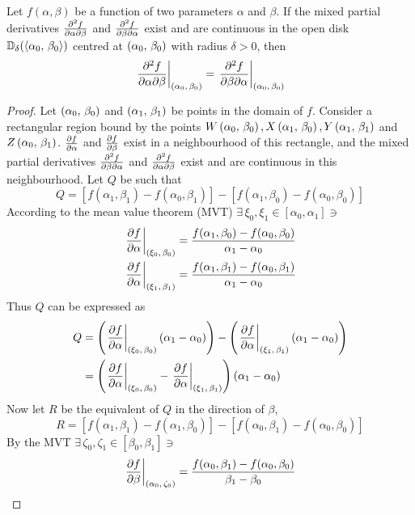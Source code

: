 \begin{lemma}\label{lemma:CLAIRAUT}
	Let $f(\alpha,\beta)$ be a function of two parameters $\alpha$ and $\beta$. If the mixed partial derivatives $\pdv{f}{\alpha}{\beta}$
	and $\pdv{f}{\beta}{\alpha}$ exist and are continuous in the open disk $\mathbb{D}_\delta(\langle\alpha_0,\,\beta_0\rangle)$ centred at
	$\left(\alpha_0,\,\beta_0\right)$ with radius $\delta>0$, then
	$$
		\eval{\pdv{f}{\alpha}{\beta}}_{\point{\alpha_0}{\beta_0}}=\eval{\pdv{f}{\beta}{\alpha}}_{\point{\alpha_0}{\beta_0}}
	$$
	\cite{GARRETT2015377}
	\begin{proof}
		Let $\left(\alpha_0,\,\beta_0\right)$ and $\left(\alpha_1,\,\beta_1\right)$ be points in the domain of $f$. Consider a rectangular region bound by the
		points $W\left(\alpha_0,\,\beta_0\right),X\left(\alpha_1,\,\beta_0\right), Y\left(\alpha_1,\,\beta_1\right)$  and $Z\left(\alpha_0,\,\beta_1\right)$. 
		$\pdv{f}{\alpha}$ and $\pdv{f}{\beta}$ exist in a neighbourhood of this rectangle, and the mixed partial derivatives 
		$\pdv{f}{\beta}{\alpha}$ and $\pdv{f}{\alpha}{\beta}$ exist and are continuous in this neighbourhood. Let $Q$ be such that
		$$
		Q=[f(\alpha_1,\beta_1)-f(\alpha_0,\beta_1)]-[f(\alpha_1,\beta_0)-f(\alpha_0,\beta_0)]
		$$
		According to the mean value theorem (MVT) $\exists\,\xi_0,\xi_1\in[\alpha_0,\alpha_1]\ni$
		\begin{align*}
			\eval{\pdv{f}{\alpha}}_{\point{\xi_0}{\beta_0}}&=\frac{f(\alpha_1,\beta_0)-f(\alpha_0,\beta_0)}{\alpha_1-\alpha_0}\\
			\eval{\pdv{f}{\alpha}}_{\point{\xi_1}{\beta_1}}&=\frac{f(\alpha_1,\beta_1)-f(\alpha_0,\beta_1)}{\alpha_1-\alpha_0}
		\end{align*}
		Thus $Q$ can be expressed as
		\begin{align*}
			Q&=\left(\eval{\pdv{f}{\alpha}}_{\point{\xi_0}{\beta_0}}\left(\alpha_1-\alpha_0\right)\right)-\left(\eval{\pdv{f}{\alpha}}_{\point{\xi_1}{\beta_1}}\left(\alpha_1-\alpha_0\right)\right)\\
			&=\left(\eval{\pdv{f}{\alpha}}_{\point{\xi_0}{\beta_0}}-\eval{\pdv{f}{\alpha}}_{\point{\xi_1}{\beta_1}}\right)\left(\alpha_1-\alpha_0\right)
		\end{align*}
		Now let $R$ be the equivalent of $Q$ in the direction of $\beta$,
		$$
			R=[f(\alpha_1,\beta_1)-f(\alpha_1,\beta_0)]-[f(\alpha_0,\beta_1)-f(\alpha_0,\beta_0)]
		$$
		By the MVT $\exists\,\zeta_0,\zeta_1\in[\beta_0,\beta_1]\ni$
		\begin{align*}
			\eval{\pdv{f}{\beta}}_{\point{\alpha_0}{\zeta_0}}&=\frac{f(\alpha_0,\beta_1)-f(\alpha_0,\beta_0)}{\beta_1-\beta_0}\\

\end{align*}
\end{proof}
\end{lemma}
